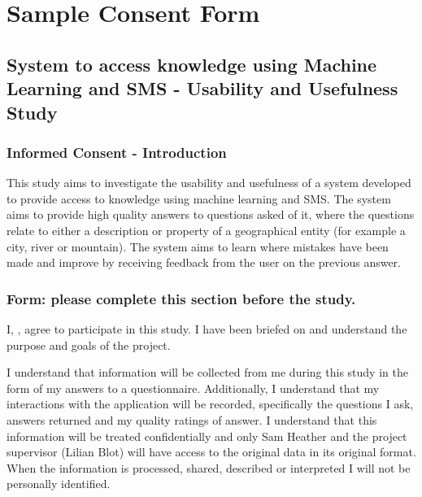 \documentclass[authoryearcitations]{UoYCSproject}
\begin{document}
\chapter{Sample Consent Form}
\label{sec:appendixConsentForm}
\newpage

\section*{System to access knowledge using Machine Learning and SMS - Usability and Usefulness Study}
{\parindent0pt
\subsection*{Informed Consent - Introduction}
This study aims to investigate the usability and usefulness of a system developed to provide access to knowledge using machine learning and SMS.  The system aims to provide high quality answers to questions asked of it, where the questions relate to either a description or property of a geographical entity (for example a city, river or mountain).  The system aims to learn where mistakes have been made and improve by receiving feedback from the user on the previous answer.  

\subsection*{Form: please complete this section before the study.}
I, \textunderscore\textunderscore\textunderscore\textunderscore\textunderscore\textunderscore\textunderscore\textunderscore\textunderscore\textunderscore\textunderscore\textunderscore\textunderscore\textunderscore\textunderscore\textunderscore\textunderscore\textunderscore\textunderscore\textunderscore\textunderscore\textunderscore\textunderscore\textunderscore\textunderscore\textunderscore\textunderscore\textunderscore\textunderscore\textunderscore\textunderscore\textunderscore\textunderscore\textunderscore\textunderscore\textunderscore\textunderscore\textunderscore\textunderscore\textunderscore\textunderscore\textunderscore, agree to participate in this study.  I have been briefed on and understand the purpose and goals of the project.

I understand that information will be collected from me during this study in the form of my answers to a questionnaire.  Additionally, I understand that my interactions with the application will be recorded, specifically the questions I ask, answers returned and my quality ratings of answer. I understand that this information will be treated confidentially and only Sam Heather and the project supervisor (Lilian Blot) will have access to the original data in its original format.  When the information is processed, shared, described or interpreted I will not be personally identified.

}
\end{document}
